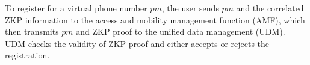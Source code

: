 To register for a virtual phone number $pm$, the user sends $pm$ and the correlated ZKP information to the access and mobility management function (AMF), which then transmits $pm$ and ZKP proof to the unified data management (UDM). UDM checks the validity of ZKP proof and either accepts or rejects the registration.



